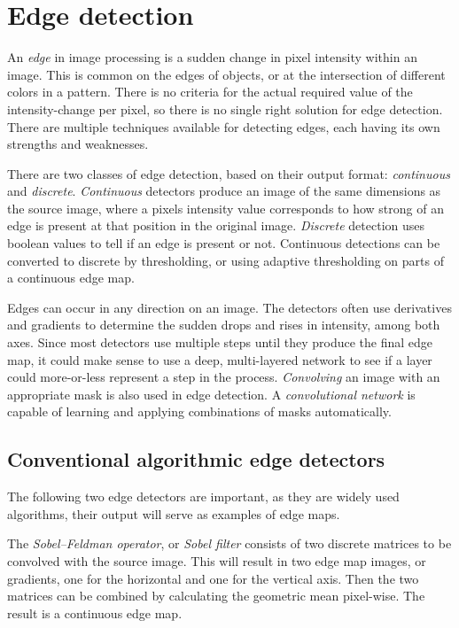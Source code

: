 \documentclass[12pt]{report}
\begin{document}
\section{Edge detection}
An \textit{edge} in image processing is a sudden change in pixel intensity within an image. This is common on the edges of objects, or at the intersection of different colors in a pattern. There is no criteria for the actual required value of the intensity-change per pixel, so there is no single right solution for edge detection. There are multiple techniques available for detecting edges, each having its own strengths and weaknesses.

There are two classes of edge detection, based on their output format: \textit{continuous} and \textit{discrete}. \textit{Continuous} detectors produce an image of the same dimensions as the source image, where a pixels intensity value corresponds to how strong of an edge is present at that position in the original image. \textit{Discrete} detection uses boolean values to tell if an edge is present or not. Continuous detections can be converted to discrete by thresholding, or using adaptive thresholding on parts of a continuous edge map.

Edges can occur in any direction on an image. The detectors often use derivatives and gradients to determine the sudden drops and rises in intensity, among both axes. Since most detectors use multiple steps until they produce the final edge map, it could make sense to use a deep, multi-layered network to see if a layer could more-or-less represent a step in the process. \textit{Convolving} an image with an appropriate mask is also used in edge detection. A \textit{convolutional network} is capable of learning and applying combinations of masks automatically.
\subsection{Conventional algorithmic edge detectors}
The following two edge detectors are important, as they are widely used algorithms, their output will serve as examples of edge maps.

The \textit{Sobel–Feldman operator}, or \textit{Sobel filter} \cite{sobel} consists of two discrete matrices to be convolved with the source image. This will result in two edge map images, or gradients, one for the horizontal and one for the vertical axis. Then the two matrices can be combined by calculating the geometric mean pixel-wise. The result is a continuous edge map.
\end{document}
